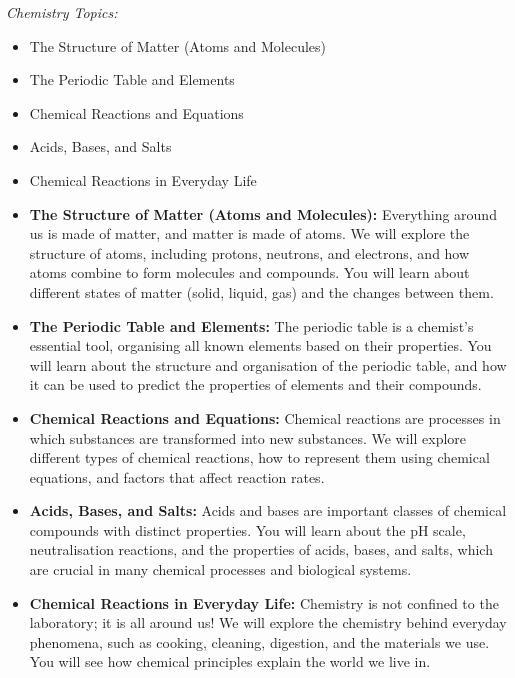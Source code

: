 \begin{marginnote}
\textit{Chemistry Topics:}
\begin{itemize}
    \item The Structure of Matter (Atoms and Molecules)
    \item The Periodic Table and Elements
    \item Chemical Reactions and Equations
    \item Acids, Bases, and Salts
    \item Chemical Reactions in Everyday Life
\end{itemize}
\end{marginnote}

\begin{itemize}
    \item \textbf{The Structure of Matter (Atoms and Molecules):}  Everything around us is made of matter, and matter is made of atoms.  We will explore the structure of atoms, including protons, neutrons, and electrons, and how atoms combine to form molecules and compounds.  You will learn about different states of matter (solid, liquid, gas) and the changes between them.
    \item \textbf{The Periodic Table and Elements:}  The periodic table is a chemist's essential tool, organising all known elements based on their properties.  You will learn about the structure and organisation of the periodic table, and how it can be used to predict the properties of elements and their compounds.
    \item \textbf{Chemical Reactions and Equations:}  Chemical reactions are processes in which substances are transformed into new substances.  We will explore different types of chemical reactions, how to represent them using chemical equations, and factors that affect reaction rates.
    \item \textbf{Acids, Bases, and Salts:}  Acids and bases are important classes of chemical compounds with distinct properties.  You will learn about the pH scale, neutralisation reactions, and the properties of acids, bases, and salts, which are crucial in many chemical processes and biological systems.
    \item \textbf{Chemical Reactions in Everyday Life:} Chemistry is not confined to the laboratory; it is all around us!  We will explore the chemistry behind everyday phenomena, such as cooking, cleaning, digestion, and the materials we use.  You will see how chemical principles explain the world we live in.
\end{itemize}

